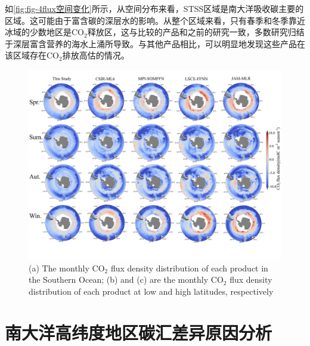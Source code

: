 如\autoref{fig:fig-4flux空间变化}所示，从空间分布来看，STSS区域是南大洋吸收碳主要的区域。这可能由于富含碳的深层水的影响。从整个区域来看，只有春季和冬季靠近冰域的少数地区是$\mathrm{CO_2}$释放区，这与比较的产品和之前的研究一致，多数研究归结于深层富含营养的海水上涌所导致。与其他产品相比，可以明显地发现这些产品在该区域存在$\mathrm{CO_2}$排放高估的情况。
\begin{figure}[htbp]
    \centering
    \includegraphics[width=\linewidth]{figure/第四章用图/图4-flux空间分布.jpg}
    {(a) The monthly $\mathrm{CO_2}$ flux density distribution of each product in the Southern Ocean; (b) and (c) are the monthly $\mathrm{CO_2}$ flux density distribution of each product at low and high latitudes, respectively}
\end{figure}

\section{南大洋高纬度地区碳汇差异原因分析}

